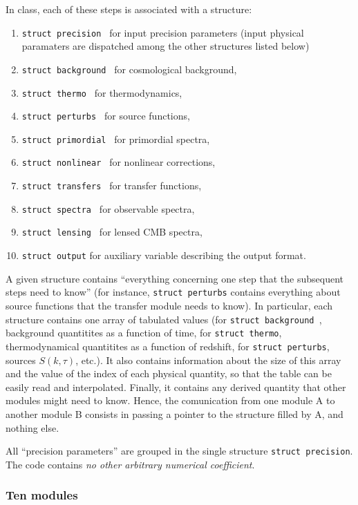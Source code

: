 \documentclass{article}
\begin{document}
In {\sc class}, each of these steps is associated with a structure:
\begin{enumerate}
\item {\tt  struct precision }      for input precision parameters (input physical paramaters are dispatched among the other structures listed below)
\item {\tt  struct background }      for cosmological background,
\item {\tt  struct thermo      }     for thermodynamics,
\item {\tt  struct perturbs     }    for source functions,
\item {\tt  struct primordial  }        for primordial spectra,
\item {\tt  struct nonlinear  }        for nonlinear corrections,
\item {\tt  struct transfers }       for transfer functions,
\item {\tt  struct spectra     }     for observable spectra,
\item {\tt  struct lensing     }     for lensed CMB spectra,
\item {\tt struct output} for auxiliary variable describing the output format.
\end{enumerate}
A given structure contains ``everything concerning one step that the
subsequent steps need to know'' (for instance, {\tt  struct perturbs} contains everything about source
functions that the transfer module needs to know). In particular, each
structure contains one array of tabulated values (for {\tt  struct background }, background
quantitites as a function of time, for {\tt  struct thermo}, thermodynamical quantitites as a
function of redshift, for {\tt  struct perturbs}, sources $S(k, \tau)$, etc.).  It
also contains information about the size of this array and the value
of the index of each physical quantity, so that the table can be
easily read and interpolated. Finally, it contains any derived
quantity that other modules might need to know. Hence, the
comunication from one module A to another module B
consists in passing a pointer to the structure filled by A, and nothing else.

All ``precision parameters'' are grouped in the single structure
{\tt struct precision}. The code contains {\it no other arbitrary
numerical coefficient}. 

\subsubsection{Ten modules}
\end{document}
